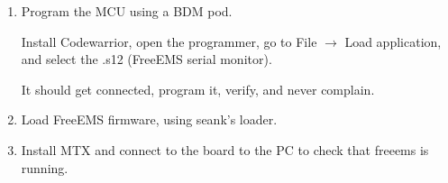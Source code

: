 \documentclass[12pt,a4paper,titlepage]{article}
\begin{document}
\begin{enumerate}
\item Program the MCU using a BDM pod.

Install Codewarrior, open the programmer, go to File $\rightarrow$ Load application, and select the .s12 (FreeEMS serial monitor).

It should get connected, program it, verify, and never complain.

\item Load FreeEMS firmware, using seank's loader.

\item Install  MTX and connect to the board to the PC to check that freeems is running.

\end{enumerate}
\end{document}
